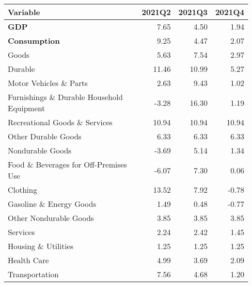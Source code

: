 \documentclass[11pt, letterpaper]{article}\usepackage[]{graphicx}\usepackage[]{color}
\begin{document}
\begin{table}[H]
\centering
\begingroup\fontsize{10pt}{12pt}\selectfont
\begin{tabular}{lrrr}
  \hline
Variable & 2021Q2 & 2021Q3 & 2021Q4 \\ 
  \hline
\hspace{0mm} \textbf{GDP} & 7.65 & 4.50 & 1.94 \\ 
  \hspace{0mm} \textbf{Consumption} & 9.25 & 4.47 & 2.07 \\ 
  \hspace{8mm}  Goods & 5.63 & 7.54 & 2.97 \\ 
  \hspace{16mm}  Durable & 11.46 & 10.99 & 5.27 \\ 
  \hspace{24mm}  Motor Vehicles \& Parts & 2.63 & 9.43 & 1.02 \\ 
  \hspace{24mm}  Furnishings \& Durable Household Equipment & -3.28 & 16.30 & 1.19 \\ 
  \hspace{24mm}  Recreational Goods \& Services & 10.94 & 10.94 & 10.94 \\ 
  \hspace{24mm}  Other Durable Goods & 6.33 & 6.33 & 6.33 \\ 
  \hspace{16mm}  Nondurable Goods & -3.69 & 5.14 & 1.34 \\ 
  \hspace{24mm}  Food \& Beverages for Off-Premises Use & -6.07 & 7.30 & 0.06 \\ 
  \hspace{24mm}  Clothing & 13.52 & 7.92 & -0.78 \\ 
  \hspace{24mm}  Gasoline \& Energy Goods & 1.49 & 0.48 & -0.77 \\ 
  \hspace{24mm}  Other Nondurable Goods & 3.85 & 3.85 & 3.85 \\ 
  \hspace{8mm}  Services & 2.24 & 2.42 & 1.45 \\ 
  \hspace{16mm}  Housing \& Utilities & 1.25 & 1.25 & 1.25 \\ 
  \hspace{16mm}  Health Care & 4.99 & 3.69 & 2.09 \\ 
  \hspace{16mm}  Transportation & 7.56 & 4.68 & 1.20 \\ 

\end{tabular}
\end{table}
\end{document}
